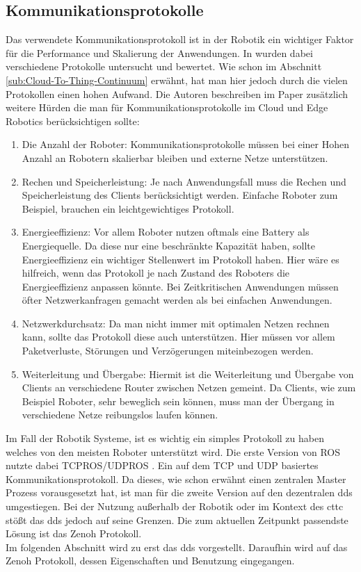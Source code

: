 \subsection{Kommunikationsprotokolle} %
\label{sub:Kommunikationsprotokolle}

Das verwendete Kommunikationsprotokoll ist in der Robotik ein wichtiger Faktor für die Performance und Skalierung der Anwendungen. In \cite{jawharNetworkingMultiRobotSystems2018} wurden dabei verschiedene Protokolle untersucht und bewertet. Wie schon im Abschnitt \ref{sub:Cloud-To-Thing-Continuum} erwähnt, hat man hier jedoch durch die vielen Protokollen einen hohen Aufwand. Die Autoren beschreiben im Paper zusätzlich weitere Hürden die man für Kommunikationsprotokolle im Cloud und Edge Robotics berücksichtigen sollte:

\begin{enumerate}
  \item Die Anzahl der Roboter: Kommunikationsprotokolle müssen bei einer Hohen Anzahl an Robotern skalierbar bleiben und externe Netze unterstützen.
  \item Rechen und Speicherleistung: Je nach Anwendungsfall muss die Rechen und Speicherleistung des Clients berücksichtigt werden. Einfache Roboter zum Beispiel, brauchen ein leichtgewichtiges Protokoll.
  \item Energieeffizienz: Vor allem Roboter nutzen oftmals eine Battery als Energiequelle. Da diese nur eine beschränkte Kapazität haben, sollte Energieeffizienz ein wichtiger Stellenwert im Protokoll haben. Hier wäre es hilfreich, wenn das Protokoll je nach Zustand des Roboters die Energieeffizienz anpassen könnte. Bei Zeitkritischen Anwendungen müssen öfter Netzwerkanfragen gemacht werden als bei einfachen Anwendungen.
  \item Netzwerkdurchsatz: Da man nicht immer mit optimalen Netzen rechnen kann, sollte das Protokoll diese auch unterstützen. Hier müssen vor allem Paketverluste, Störungen und Verzögerungen miteinbezogen werden.
  \item Weiterleitung und Übergabe: Hiermit ist die Weiterleitung und Übergabe von Clients an verschiedene Router zwischen Netzen gemeint. Da Clients, wie zum Beispiel Roboter, sehr beweglich sein können, muss man der Übergang in verschiedene Netze reibungslos laufen können.
\end{enumerate}

Im Fall der Robotik Systeme, ist es wichtig ein simples Protokoll zu haben welches von den meisten Roboter unterstützt wird. Die erste Version von ROS nutzte dabei TCPROS/UDPROS \cite{maruyamaExploringPerformanceROS22016}. Ein auf dem TCP und UDP basiertes Kommunikationsprotokoll. Da dieses, wie schon erwähnt einen zentralen Master Prozess vorausgesetzt hat, ist man für die zweite Version auf den dezentralen \acrlong{dds} umgestiegen. Bei der Nutzung außerhalb der Robotik oder im Kontext des \acrlong{cttc} stößt das \acrlong{dds} jedoch auf seine Grenzen. Die zum aktuellen Zeitpunkt passendste Lösung ist das Zenoh Protokoll.\\
Im folgenden Abschnitt wird zu erst das \acrlong{dds} vorgestellt. Daraufhin wird auf das Zenoh Protokoll, dessen Eigenschaften und Benutzung eingegangen.


